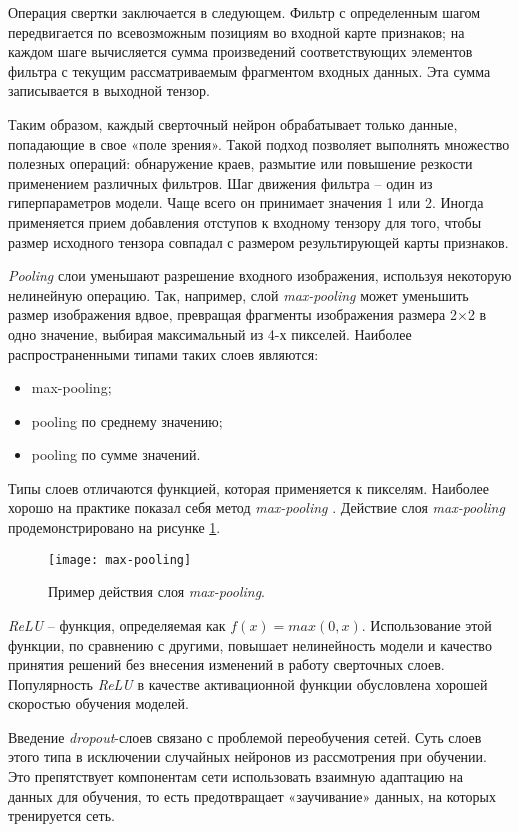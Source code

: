 Операция свертки заключается в следующем. Фильтр с определенным шагом передвигается по всевозможным позициям во входной карте признаков; на каждом шаге вычисляется сумма произведений соответствующих элементов фильтра с текущим рассматриваемым фрагментом входных данных. Эта сумма записывается в выходной тензор.

Таким образом, каждый сверточный нейрон обрабатывает только данные, попадающие в свое «поле зрения». Такой подход позволяет выполнять множество полезных операций: обнаружение краев, размытие или повышение резкости применением различных фильтров.
Шаг движения фильтра – один из гиперпараметров модели. Чаще всего он принимает значения 1 или 2.
Иногда применяется прием добавления отступов к входному тензору для того, чтобы размер исходного тензора совпадал с размером результирующей карты признаков.

\emph{Pooling} слои уменьшают разрешение входного изображения, используя некоторую нелинейную операцию. Так, например, слой \emph{max-pooling} может уменьшить размер изображения вдвое, превращая фрагменты изображения размера 2$\times$2 в одно значение, выбирая максимальный из 4-х пикселей. Наиболее распространенными типами таких слоев являются:
\begin{itemize}
	\item max-pooling;
	\item pooling по среднему значению;
	\item pooling по сумме значений.
\end{itemize}

Типы слоев отличаются функцией, которая применяется к пикселям. Наиболее хорошо на практике показал себя метод \emph{max-pooling} \cite{cnn-max-pooling}. Действие слоя \emph{max-pooling} продемонстрировано на рисунке \ref{fig:max-pooling}.
\begin{figure}[h]
	\centering
	\texttt{[image: max-pooling]}
	\caption{Пример действия слоя \emph{max-pooling}.}
	\label{fig:max-pooling}
\end{figure}

\emph{ReLU} – функция, определяемая как $f(x)=max(0, x)$. Использование этой функции, по сравнению с другими, повышает нелинейность модели и качество принятия решений без внесения изменений в работу сверточных слоев\cite[с.~3]{cnn-imagenet}. Популярность \emph{ReLU} в качестве активационной функции обусловлена хорошей скоростью обучения моделей.

Введение \emph{dropout}-слоев связано с проблемой переобучения сетей\cite{dnn-dropout}. Суть слоев этого типа в исключении случайных нейронов из рассмотрения при обучении. Это препятствует компонентам сети использовать взаимную адаптацию на данных для обучения, то есть предотвращает «заучивание» данных, на которых тренируется сеть.

